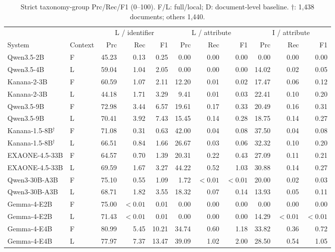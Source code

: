 \begin{table}[t]
\caption{Strict taxonomy-group Prc/Rec/F1 (0--100). F/L: full/local; D: document-level baseline. $\dagger$: 1,438 documents; others 1,440.}
\label{tab:taxonomy-results}
\small
\begin{tabular*}{\textwidth}{@{\extracolsep{\fill}}llrrrrrrrrr@{}}
\toprule
& & \multicolumn{3}{c}{L / identifier} & \multicolumn{3}{c}{L / attribute} & \multicolumn{3}{c}{I / attribute} \\
System & Context & Prc & Rec & F1 & Prc & Rec & F1 & Prc & Rec & F1 \\
\midrule
Qwen3.5-2B & F & 45.23 & 0.13 & 0.25 & 0.00 & 0.00 & 0.00 & 0.00 & 0.00 & 0.00 \\
Qwen3.5-4B & L & 59.04 & 1.04 & 2.05 & 0.00 & 0.00 & 0.00 & 14.02 & 0.02 & 0.05 \\
Kanana-2-3B & F & 60.59 & 1.07 & 2.11 & 12.20 & 0.01 & 0.02 & 17.47 & 0.06 & 0.12 \\
Kanana-2-3B & L & 44.18 & 1.71 & 3.29 & 9.41 & 0.01 & 0.03 & 22.41 & 0.10 & 0.20 \\
Qwen3.5-9B & F & 72.98 & 3.44 & 6.57 & 19.61 & 0.17 & 0.33 & 20.49 & 0.16 & 0.31 \\
Qwen3.5-9B & L & 70.41 & 3.92 & 7.43 & 15.45 & 0.14 & 0.28 & 18.75 & 0.14 & 0.27 \\
Kanana-1.5-8B$^\dagger$ & F & 71.08 & 0.31 & 0.63 & 42.00 & 0.04 & 0.08 & 37.50 & 0.04 & 0.08 \\
Kanana-1.5-8B$^\dagger$ & L & 66.51 & 0.84 & 1.66 & 26.67 & 0.03 & 0.06 & 32.32 & 0.10 & 0.20 \\
EXAONE-4.5-33B & F & 64.57 & 0.70 & 1.39 & 20.31 & 0.22 & 0.43 & 27.09 & 0.11 & 0.21 \\
EXAONE-4.5-33B & L & 69.59 & 1.67 & 3.27 & 44.22 & 0.52 & 1.03 & 30.88 & 0.14 & 0.27 \\
Qwen3-30B-A3B & F & 75.10 & 0.55 & 1.09 & 1.72 & $<0.01$ & $<0.01$ & 20.00 & 0.02 & 0.03 \\
Qwen3-30B-A3B & L & 68.71 & 1.82 & 3.55 & 18.32 & 0.07 & 0.14 & 13.93 & 0.05 & 0.11 \\
Gemma-4-E2B & F & 75.00 & $<0.01$ & 0.01 & 0.00 & 0.00 & 0.00 & 0.00 & 0.00 & 0.00 \\
Gemma-4-E2B & L & 71.43 & $<0.01$ & 0.01 & 0.00 & 0.00 & 0.00 & 14.29 & $<0.01$ & $<0.01$ \\
Gemma-4-E4B & F & 80.99 & 5.45 & 10.21 & 34.74 & 0.60 & 1.18 & 33.82 & 0.36 & 0.72 \\
Gemma-4-E4B & L & 77.97 & 7.37 & 13.47 & 39.09 & 1.02 & 2.00 & 28.50 & 0.54 & 1.05 \\

\end{tabular*}
\end{table}

